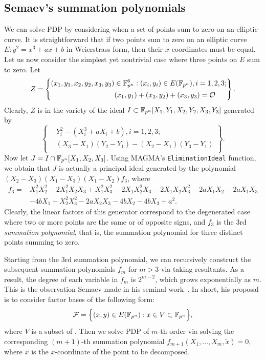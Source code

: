 \subsection{Semaev's summation polynomials}
%
\label{sec:summation-polynomial}
%
We can solve PDP by considering when a set of points sum to zero on an
elliptic curve.
%
It is straightforward that if two points sum to zero on an elliptic
curve $E: y^2=x^3+ax+b$ in Weierstrass form, then their
$x$-coordinates must be equal.
%
Let us now consider the simplest yet nontrivial case where three
points on $E$ sum to zero.
%
Let
\[ Z=\left\{\begin{aligned}
      (x_1,y_1,x_2,y_2,x_3,y_3)&\in\mathbb F_{p^n}^6:(x_i,y_i)\in E(\mathbb F_{p^n}),i=1,2,3; \\
      & (x_1,y_1)+(x_2,y_2)+(x_3,y_3)=\mathcal O
    \end{aligned} \right\}. \]
%
Clearly, $Z$ is in the variety of the ideal
$I\subset\mathbb F_{p^n}[X_1,Y_1,X_2,Y_2,X_3,Y_3]$ generated by
\[ \left\{\begin{aligned}
      & Y_i^2 - (X_i^3 + aX_i + b),i=1,2,3; \\
      &  (X_3 - X_1)(Y_2 - Y_1) - (X_2 - X_1)(Y_3 - Y_1)\\
    \end{aligned}\right\}. \]
%
Now let $J=I\cap\mathbb F_{p^n}[X_1,X_2,X_3]$.
%
Using MAGMA's \texttt{EliminationIdeal} function, we obtain that $J$
is actually a principal ideal generated by the polynomial
$(X_2 - X_3)(X_1 - X_3)(X_1 - X_2)f_3$, where
%
\begin{align*}
  f_3 = & X_1^2X_2^2 - 2X_1^2X_2X_3 + X_1^2X_3^2 - 2X_1X_2^2X_3 - 2X_1X_2X_3^2 - 2aX_1X_2 - 2aX_1X_3 \\
        & - 4bX_1 + X_2^2X_3^2 - 2aX_2X_3 - 4bX_2 - 4bX_3 + a^2.
\end{align*}
%
Clearly, the linear factors of this generator correspond to the
degenerated case where two or more points are the same or of opposite
signs, and $f_3$ is the 3rd \emph{summation polynomial}, that is, the
summation polynomial for three distinct points summing to zero.

Starting from the 3rd summation polynomial, we can recursively
construct the subsequent summation polynomials $f_m$ for $m>3$ via
taking resultants.
%
As a result, the degree of each variable in $f_m$ is $2^{m-2}$, which
grows exponentially as $m$.
%
This is the observation Semaev made in his seminal
work~\cite{DBLP:journals/iacr/Semaev04}.
%
In short, his proposal is to consider factor bases of the following
form:
\[ \mathcal F=\Big\{(x,y)\in E(\mathbb F_{p^n}):x\in V\subset\mathbb F_{p^n}\Big\}, \]
where $V$ is a subset of .
%
Then we solve PDP of $m$-th order via solving the corresponding
$(m+1)$-th summation polynomial $f_{m+1}(X_1,\ldots,X_m,\tilde x)=0$,
where $\tilde x$ is the $x$-coordinate of the point to be decomposed.


